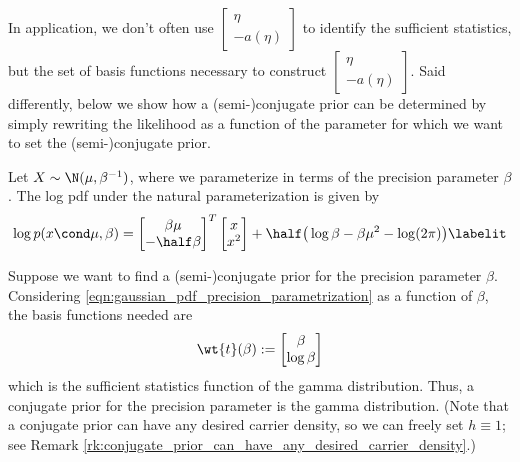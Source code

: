 In application, we don't often use $\begin{bmatrix} 
\eta \\
-a(\eta)
\end{bmatrix}$ to identify the sufficient statistics, but the set of basis functions necessary to construct $\begin{bmatrix} 
\eta \\
-a(\eta)
\end{bmatrix}$. Said differently, below we show how a (semi-)conjugate prior can be determined by simply rewriting the likelihood as a function of the parameter for which we want to set the (semi-)conjugate prior.  

\begin{example}
Let $X \sim \N(\mu, \beta^{-1})$, where we parameterize in terms of the precision parameter $\beta$.  The log pdf under the natural parameterization is given by 
\begin{align*} 
\log p(x \cond \mu, \beta) = 
\begin{bmatrix} 
\beta \mu \\
-\half \beta
\end{bmatrix}^T 
\begin{bmatrix} 
x \\
x^2
\end{bmatrix} 
+ \half \big(\log \beta - \beta \mu^2 - \log (2 \pi) \big)	
\labelit \label{eqn:gaussian_pdf_precision_parametrization}
\end{align*}

Suppose we want to find a (semi-)conjugate prior for the precision parameter $\beta$.  Considering \eqref{eqn:gaussian_pdf_precision_parametrization} as a function of $\beta$, the basis functions needed are
\[ \wt{t}(\beta) := 
\begin{bmatrix} 
\beta \\
\log \beta
\end{bmatrix} 
  \]
 which is the sufficient statistics function of the gamma distribution.  Thus, a conjugate prior for the precision parameter is the gamma distribution. (Note that a conjugate prior can have any desired carrier density, so we can freely set $h \equiv 1$; see Remark \ref{rk:conjugate_prior_can_have_any_desired_carrier_density}.)
\end{example}


